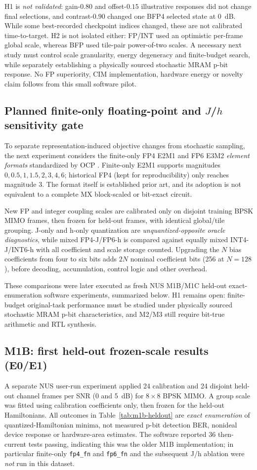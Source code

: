\documentclass[11pt,a4paper]{article}
\begin{document}
H1 is \emph{not validated}: gain-$0.80$ and offset-$0.15$
illustrative responses did not change final selections, and
contrast-$0.90$ changed one BFP4 selected state at $0$~dB.
While some best-recorded checkpoint indices changed, these
are not calibrated time-to-target. H2 is not isolated either:
FP/INT used an optimistic per-frame global scale, whereas
BFP used tile-pair power-of-two scales. A necessary next study
must control scale granularity, energy degeneracy and finite-budget
search, while separately establishing a physically sourced
stochastic MRAM p-bit response. No FP superiority, CIM implementation,
hardware energy or novelty claim follows from this small software pilot.
\subsection{Planned finite-only floating-point and $J$/$h$ sensitivity gate}
To separate representation-induced objective changes from stochastic
sampling, the next experiment considers the finite-only FP4 E2M1 and
FP6 E3M2 \emph{element formats} standardized by OCP \cite{ocpmx2023}.
Finite-only E2M1 supports magnitudes $0,0.5,1,1.5,2,3,4,6$;
historical FP4 (kept for reproducibility) only reaches magnitude $3$.
The format itself is established prior art, and its adoption is not
equivalent to a complete MX block-scaled or bit-exact circuit.

New FP and integer coupling scales are calibrated only on disjoint
training BPSK MIMO frames, then frozen for held-out frames, with
identical global/tile grouping. J-only and h-only quantization are
\emph{unquantized-opposite oracle diagnostics}, while mixed FP4-J/FP6-h
is compared against equally mixed INT4-J/INT6-h with all coefficient
and scale storage counted. Upgrading the $N$ bias coefficients from
four to six bits adds $2N$ nominal coefficient bits (256 at $N=128$),
before decoding, accumulation, control logic and other overhead.

These comparisons were later executed as fresh NUS M1B/M1C
held-out exact-enumeration software experiments, summarized below.
H1 remains open: finite-budget original-task performance must be studied
under physically sourced stochastic MRAM p-bit characteristics, and
M2/M3 still require bit-true arithmetic and RTL synthesis.
\subsection{M1B: first held-out frozen-scale results (E0/E1)}
A separate NUS user-run experiment applied 24 calibration and
24 disjoint held-out channel frames per SNR (0 and 5~dB) for
$8\times8$ BPSK MIMO. A group scale was fitted using calibration
coefficients only, then frozen for the held-out Hamiltonians.
All outcomes in Table~\ref{tab:m1b-heldout} are \emph{exact enumeration}
of quantized-Hamiltonian minima, not measured p-bit detection BER,
nonideal device response or hardware-area estimates. The software
reported 36 then-current tests passing, indicating this was the
older M1B implementation; in particular finite-only \texttt{fp4\_fn}
and \texttt{fp6\_fn} and the subsequent J/h ablation were \emph{not}
run in this dataset.
\end{document}
